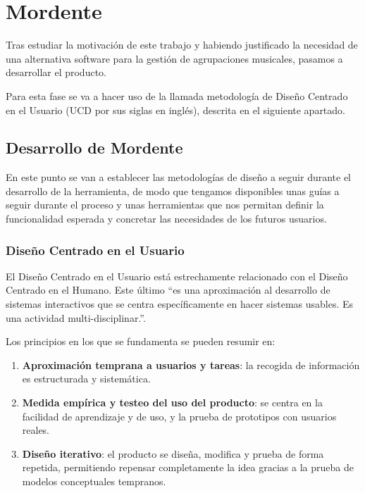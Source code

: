\chapter{Mordente}

Tras estudiar la motivación de este trabajo y habiendo justificado la necesidad de una alternativa software para la gestión de agrupaciones musicales, pasamos a desarrollar el producto.

Para esta fase se va a hacer uso de la llamada metodología de Diseño Centrado en el Usuario (UCD por sus siglas en inglés), descrita en el siguiente apartado. 

\section{Desarrollo de Mordente}

En este punto se van a establecer las metodologías de diseño a seguir durante el desarrollo de la herramienta, de modo que tengamos disponibles unas guías a seguir durante el proceso y unas herramientas que nos permitan definir la funcionalidad esperada y concretar las necesidades de los futuros usuarios.

\subsection{Diseño Centrado en el Usuario}

El Diseño Centrado en el Usuario está estrechamente relacionado con el Diseño Centrado en el Humano\cite{w3UCD}. Este último ``es una aproximación al desarrollo de sistemas interactivos que se centra específicamente en hacer sistemas usables. Es una actividad multi-disciplinar.''\cite{isoHCD}.

Los principios\cite{jeffreyUCD} en los que se fundamenta se pueden resumir en:

\begin{enumerate}
    \item \textbf{Aproximación temprana a usuarios y tareas}: la recogida de información es estructurada y sistemática.
    \item \textbf{Medida empírica y testeo del uso del producto}: se centra en la facilidad de aprendizaje y de uso, y la prueba de prototipos con usuarios reales.
    \item \textbf{Diseño iterativo}: el producto se diseña, modifica y prueba de forma repetida, permitiendo repensar completamente la idea gracias a la prueba de modelos conceptuales tempranos.
\end{enumerate}

